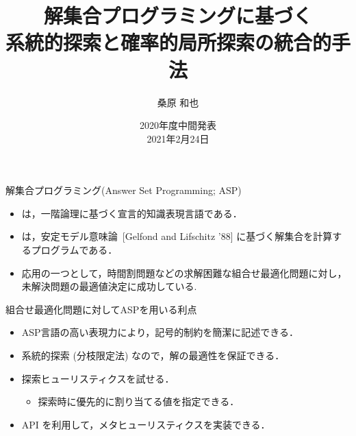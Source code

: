 \documentclass[11pt,dvipdfmx,handout]{beamer}
\title{解集合プログラミングに基づく\\系統的探索と確率的局所探索の統合的手法}
\author{桑原 和也}
\date{2020年度中間発表\\2021年2月24日}
\institute{番原研究室}
\begin{document}
\maketitle
\begin{frame}{解集合プログラミング(Answer Set Programming; ASP)}
  \begin{itemize}
  \item {}は，一階論理に基づく宣言的知識表現言語である．
  \item {}は，安定モデル意味論~[Gelfond and Lifschitz '88]
    に基づく解集合を計算するプログラムである．
  \item 応用の一つとして，時間割問題などの求解困難な組合せ最適化問題に対し，
  未解決問題の最適値決定に成功している.
  \end{itemize}
  \begin{alertblock}{組合せ最適化問題に対してASPを用いる利点}
    \begin{itemize}
    \item ASP言語の高い表現力により，記号的制約を簡潔に記述できる．
    \item 系統的探索 (分枝限定法) なので，解の最適性を保証できる．
    \item 探索ヒューリスティクスを試せる．
      \begin{itemize}
      \item 探索時に優先的に割り当てる値を指定できる．
      \end{itemize}
    \item API を利用して，メタヒューリスティクスを実装できる．
    \end{itemize}
  \end{alertblock}
\end{frame}
\end{document}
